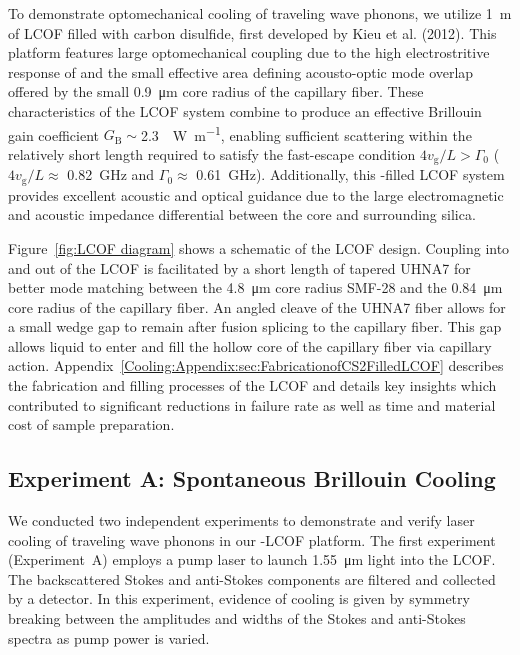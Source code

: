 To demonstrate optomechanical cooling of traveling wave phonons, we utilize \SI{1}{\meter} of \acl{LCOF} filled with carbon disulfide, first developed by Kieu et al. (2012). \cite{kieu2012integrated} This platform features large optomechanical coupling due to the high electrostritive response of  \cite{boyd2020nonlinear} and the small effective area defining acousto-optic mode overlap offered by the small \SI{0.9}{\micro\meter} core radius of the capillary fiber. These characteristics of the \ac{LCOF} system combine to produce an effective Brillouin gain coefficient \(G_{\mathrm{B}} \sim\)\SI{2.3}{\per\watt\per\meter}, enabling sufficient scattering within the relatively short length required to satisfy the fast-escape condition \(4v_{\mathrm{g}}/L > \Gamma_{\mathrm{0}}\) (\(4v_{\mathrm{g}}/L \approx\) \SI{0.82}{\giga\hertz} and \(\Gamma_{\mathrm{0}} \approx\) \SI{0.61}{\giga\hertz}). \cite{johnson2023laser} Additionally, this -filled \ac{LCOF} system provides excellent acoustic and optical guidance due to the large electromagnetic and acoustic impedance differential between the  core and surrounding silica. \cite{behunin2019spontaneous}

Figure~\ref{fig:LCOF diagram} shows a schematic of the \ac{LCOF} design. Coupling into and out of the \ac{LCOF} is facilitated by a short length of tapered \ac{UHNA7} for better mode matching between the \SI{4.8}{\micro\meter} core radius \ac{SMF-28} and the \SI{0.84}{\micro\meter} core radius of the capillary fiber. An angled cleave of the \ac{UHNA7} fiber allows for a small wedge gap to remain after fusion splicing to the capillary fiber. This gap allows liquid  to enter and fill the hollow core of the capillary fiber via capillary action. Appendix~\ref{Cooling:Appendix:sec:FabricationofCS2FilledLCOF} describes the fabrication and filling processes of the \ac{LCOF} and details key insights which contributed to significant reductions in failure rate as well as time and material cost of sample preparation.


\subsection{Experiment A: Spontaneous Brillouin Cooling}
\label{Cooling:subsec:ExperimentASpontaneousBrillouinCooling}

We conducted two independent experiments to demonstrate and verify laser cooling of traveling wave phonons in our -\ac{LCOF} platform. The first experiment (Experiment~A) employs a pump laser to launch \SI{1.55}{\micro\meter} light into the \ac{LCOF}. The backscattered Stokes and anti-Stokes components are filtered and collected by a detector. In this experiment, evidence of cooling is given by symmetry breaking between the amplitudes and widths of the Stokes and anti-Stokes spectra as pump power is varied.

